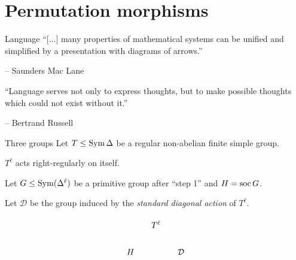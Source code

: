 \documentclass{beamer}
\theoremstyle{plain}
\theoremstyle{definition}
\begin{document}
\section{Permutation morphisms}
\begin{frame}{Language}
``[...] many properties of mathematical systems can be unified and simplified
by a presentation with diagrams of arrows.''

\hfill --
Saunders Mac Lane
\hspace{2em}

\vspace{2em}
\pause
``Language serves not only to express thoughts, but to make possible thoughts
which could not exist without it.''

\hfill --
Bertrand Russell
\hspace{2em}
\end{frame}

\begin{frame}{Three groups}
Let $T \leq \operatorname{Sym} \Delta$ be a regular non-abelian finite simple group.

$T ^ \ell$ acts right-regularly on itself.

Let $G \leq \operatorname{Sym}(\Delta ^ \ell)$ be a primitive group after
``step 1'' and $H = \operatorname{soc} G$.


Let $\mathcal D$ be the group induced by the \emph{standard diagonal action} of $T ^ \ell$.

\pause
\[
\begin{tikzcd}[column sep=small, ampersand replacement=\&]
    \&
    T ^ \ell
    \&
    \\
    H
    \&
    \&
    \mathcal D
\end{tikzcd}
\]
\end{frame}

\end{document}
